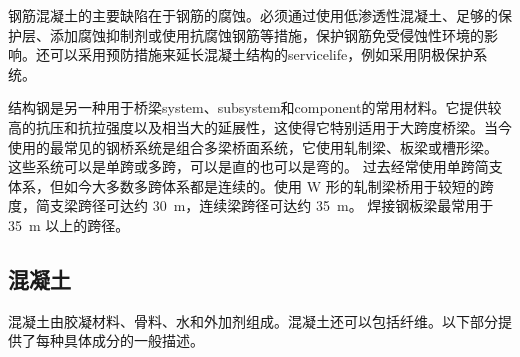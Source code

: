 钢筋混凝土的主要缺陷在于钢筋的腐蚀。必须通过使用低渗透性混凝土、足够的保护层、添加腐蚀抑制剂或使用抗腐蚀钢筋等措施，保护钢筋免受侵蚀性环境的影响。还可以采用预防措施来延长混凝土结构的\gls*{servicelife}，例如采用阴极保护系统。

结构钢是另一种用于桥梁\gls*{system}、\gls*{subsystem}和\gls*{component}的常用材料。它提供较高的抗压和抗拉强度以及相当大的延展性，这使得它特别适用于大跨度桥梁。当今使用的最常见的钢桥系统是组合多梁桥面系统，它使用轧制梁、板梁或槽形梁。 这些系统可以是单跨或多跨，可以是直的也可以是弯的。 过去经常使用单跨简支体系，但如今大多数多跨体系都是连续的。使用 W 形的轧制梁桥用于较短的跨度，简支梁跨径可达约 \qty{30}{m}，连续梁跨径可达约 \qty{35}{m}。 焊接钢板梁最常用于 \qty{35}{m} 以上的跨径。

\subsection{混凝土}
混凝土由胶凝材料、骨料、水和外加剂组成。混凝土还可以包括纤维。以下部分提供了每种具体成分的一般描述。

